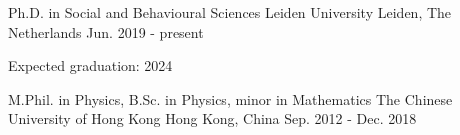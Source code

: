 

\begin{cventries}

  \cventry
    {Ph.D. in Social and Behavioural Sciences} %
    {Leiden University} %
    {Leiden, The Netherlands} %
    {Jun. 2019 - present} %
    {
      \begin{cvitems} %
        \item {Expected graduation: 2024}
      \end{cvitems}
    }

  \cventry
    {M.Phil. in Physics, B.Sc. in Physics, minor in Mathematics} %
    {The Chinese University of Hong Kong} %
    {Hong Kong, China} %
    {Sep. 2012 - Dec. 2018} %
    {}


\end{cventries}
